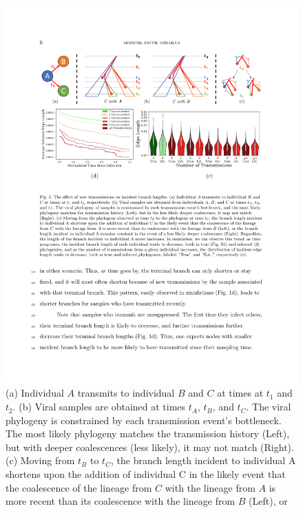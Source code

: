 \documentclass[a4paper,11pt]{article}
\begin{document}
\begin{figure}[!tp]
\centering
\includegraphics[width=\textwidth]{figs/Fig1.pdf}
\caption{ (a) Individual $A$ transmits to individual $B$ and $C$ at times at  $t_1$ and $t_2$. (b) Viral samples are obtained %
at times $t_A$, $t_B$, and $t_C$. The viral phylogeny is constrained by each transmission event's bottleneck.
The most likely phylogeny matches the transmission history (Left), but with deeper coalescences (less likely), it may not match (Right). (c) Moving from %
$t_B$ to
$t_C$, the branch length incident to individual A  shortens upon the addition of individual C  in the likely event that the coalescence of the lineage from $C$ with the lineage from $A$ is more recent than its coalescence with the lineage from $B$ (Left), or 
}
\end{figure}
\end{document}
